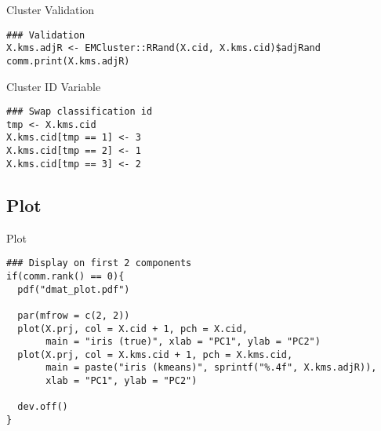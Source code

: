 \begin{frame}[fragile]
  \begin{block}{Cluster Validation}\pause
\begin{lstlisting}
### Validation
X.kms.adjR <- EMCluster::RRand(X.cid, X.kms.cid)$adjRand
comm.print(X.kms.adjR)
\end{lstlisting}
\end{block}
\end{frame}

\begin{frame}[fragile]
  \begin{block}{Cluster ID Variable}\pause
\begin{lstlisting}
### Swap classification id
tmp <- X.kms.cid
X.kms.cid[tmp == 1] <- 3
X.kms.cid[tmp == 2] <- 1
X.kms.cid[tmp == 3] <- 2
\end{lstlisting}
\end{block}
\end{frame}

\subsection{Plot}

\begin{frame}[fragile]
  \begin{block}{Plot}\pause
\begin{lstlisting}
### Display on first 2 components
if(comm.rank() == 0){
  pdf("dmat_plot.pdf")
  
  par(mfrow = c(2, 2))
  plot(X.prj, col = X.cid + 1, pch = X.cid,
       main = "iris (true)", xlab = "PC1", ylab = "PC2")
  plot(X.prj, col = X.kms.cid + 1, pch = X.kms.cid,
       main = paste("iris (kmeans)", sprintf("%.4f", X.kms.adjR)),
       xlab = "PC1", ylab = "PC2")
  
  dev.off()
}
\end{lstlisting}
\end{block}
\end{frame}


